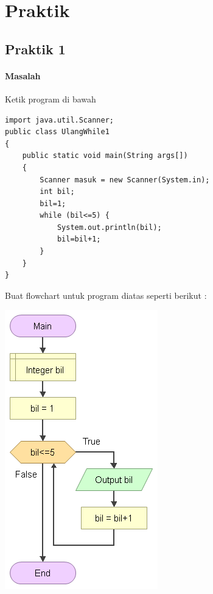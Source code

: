 \documentclass[a4paper,12pt]{article}
\begin{document}
\section{Praktik}
\subsection{Praktik 1}
\paragraph{Masalah\\}
Ketik program di bawah
\begin{lstlisting}[frame=single]
import java.util.Scanner;
public class UlangWhile1
{
    public static void main(String args[])
    {
        Scanner masuk = new Scanner(System.in);
        int bil;
        bil=1;
        while (bil<=5) {
            System.out.println(bil);
            bil=bil+1;
        }
    }
}
\end{lstlisting}
Buat flowchart untuk program diatas seperti berikut :\\
\begin{center}
	\includegraphics[scale=.5]{image--024}
\end{center}
\end{document}

